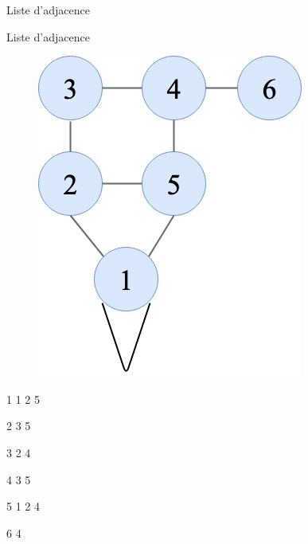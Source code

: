 \documentclass[10pt,xcolor=dvipsnames]{beamer}
\begin{document}
\begin{frame}{Liste d'adjacence}
        \begin{exampleblock}{Liste d'adjacence}
        \begin{minipage}{0.6\textwidth}
    \begin{figure}
        \centering
        \includegraphics[scale=0.3]{figures/CM3/adj-matrix.png}
        \label{fig:my_label}
    \end{figure}
    \end{minipage}
    \begin{minipage}{0.35\textwidth}
    \begin{description}
        \item 1 1 2 5
        \item 2 3 5
        \item 3 2 4
        \item 4 3 5
        \item 5 1 2 4
        \item 6 4
    \end{description}
    \end{minipage}
    \end{exampleblock}
\end{frame}
\end{document}
